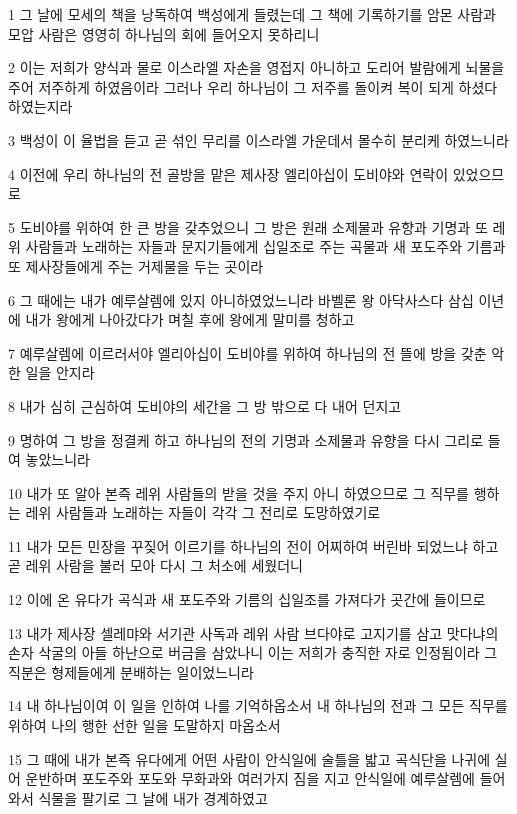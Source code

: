 \par 1 그 날에 모세의 책을 낭독하여 백성에게 들렸는데 그 책에 기록하기를 암몬 사람과 모압 사람은 영영히 하나님의 회에 들어오지 못하리니
\par 2 이는 저희가 양식과 물로 이스라엘 자손을 영접지 아니하고 도리어 발람에게 뇌물을 주어 저주하게 하였음이라 그러나 우리 하나님이 그 저주를 돌이켜 복이 되게 하셨다 하였는지라
\par 3 백성이 이 율법을 듣고 곧 섞인 무리를 이스라엘 가운데서 몰수히 분리케 하였느니라
\par 4 이전에 우리 하나님의 전 골방을 맡은 제사장 엘리아십이 도비야와 연락이 있었으므로
\par 5 도비야를 위하여 한 큰 방을 갖추었으니 그 방은 원래 소제물과 유향과 기명과 또 레위 사람들과 노래하는 자들과 문지기들에게 십일조로 주는 곡물과 새 포도주와 기름과 또 제사장들에게 주는 거제물을 두는 곳이라
\par 6 그 때에는 내가 예루살렘에 있지 아니하였었느니라 바벨론 왕 아닥사스다 삼십 이년에 내가 왕에게 나아갔다가 며칠 후에 왕에게 말미를 청하고
\par 7 예루살렘에 이르러서야 엘리아십이 도비야를 위하여 하나님의 전 뜰에 방을 갖춘 악한 일을 안지라
\par 8 내가 심히 근심하여 도비야의 세간을 그 방 밖으로 다 내어 던지고
\par 9 명하여 그 방을 정결케 하고 하나님의 전의 기명과 소제물과 유향을 다시 그리로 들여 놓았느니라
\par 10 내가 또 알아 본즉 레위 사람들의 받을 것을 주지 아니 하였으므로 그 직무를 행하는 레위 사람들과 노래하는 자들이 각각 그 전리로 도망하였기로
\par 11 내가 모든 민장을 꾸짖어 이르기를 하나님의 전이 어찌하여 버린바 되었느냐 하고 곧 레위 사람을 불러 모아 다시 그 처소에 세웠더니
\par 12 이에 온 유다가 곡식과 새 포도주와 기름의 십일조를 가져다가 곳간에 들이므로
\par 13 내가 제사장 셀레먀와 서기관 사독과 레위 사람 브다야로 고지기를 삼고 맛다냐의 손자 삭굴의 아들 하난으로 버금을 삼았나니 이는 저희가 충직한 자로 인정됨이라 그 직분은 형제들에게 분배하는 일이었느니라
\par 14 내 하나님이여 이 일을 인하여 나를 기억하옵소서 내 하나님의 전과 그 모든 직무를 위하여 나의 행한 선한 일을 도말하지 마옵소서
\par 15 그 때에 내가 본즉 유다에게 어떤 사람이 안식일에 술틀을 밟고 곡식단을 나귀에 실어 운반하며 포도주와 포도와 무화과와 여러가지 짐을 지고 안식일에 예루살렘에 들어와서 식물을 팔기로 그 날에 내가 경계하였고
